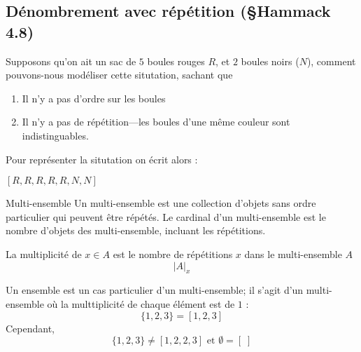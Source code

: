 \documentclass[8pt]{report}
\begin{document}
\begin{multicols*}{2}
\section{Dénombrement avec répétition (\S Hammack 4.8)}

\begin{EExample}{}{}
    Supposons qu'on ait un sac de $5$ boules rouges $R$, et $2$ boules noirs ($N$),
    comment pouvons-nous modéliser cette situtation, sachant que 
    \begin{enumerate}
        \item Il n'y a pas d'ordre sur les boules
        \item Il n'y a pas de répétition—les boules d'une même couleur sont indistinguables. 
    \end{enumerate}
    Pour représenter la situtation on écrit alors : 
    \begin{center}
    $ \left[ R, R, R, R, R, N, N \right] $
    \end{center}
\end{EExample}

\begin{Definitionx*}{Multi-ensemble}{}
   Un multi-ensemble est une collection d'objets sans ordre particulier qui peuvent être 
   répétés. Le cardinal d'un multi-ensemble est le nombre d'objets des multi-ensemble, incluant les 
   répétitions. 
\end{Definitionx*}

\begin{Definitionx*}{}{}
    La multiplicité de $x \in A$ est le nombre de répétitions $x$ dans le multi-ensemble $A$ 
    \[ |A|_x \]
\end{Definitionx*}
\begin{note}{}{}
    Un ensemble est un cas particulier d'un multi-ensemble; il s'agit d'un multi-ensemble 
    où la multtiplicité de chaque élément est de $1$ : 
    \[ \{1, 2, 3\} = \left[1, 2, 3\right]\] 
    Cependant, 
    \[  \{1, 2, 3\} \neq \left[1, 2, 2, 3 \right] \text{ et } \emptyset = \left[ \;\right] \] 
\end{note}


\end{multicols*}
\end{document}
